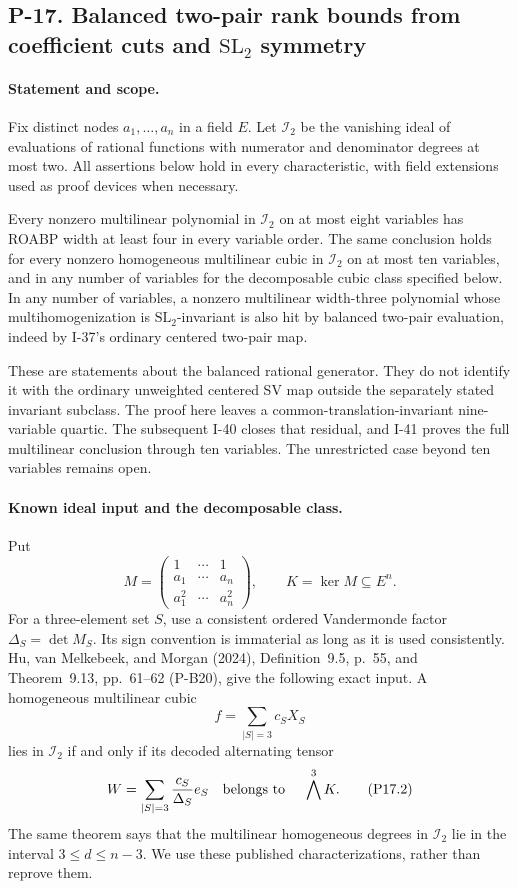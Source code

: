 \subsection{P-17. Balanced two-pair rank bounds from coefficient cuts and $\mathrm{SL}_2$ symmetry}
\label{P-17}

\paragraph{Statement and scope.}
Fix distinct nodes $a_1,\ldots,a_n$ in a field $E$.
Let $\mathcal I_2$ be the vanishing ideal of evaluations of rational
functions with numerator and denominator degrees at most two.
All assertions below hold in every characteristic, with field
extensions used as proof devices when necessary.

Every nonzero multilinear polynomial in $\mathcal I_2$ on at most
eight variables has ROABP width at least four in every variable
order. The same conclusion holds for every nonzero homogeneous
multilinear cubic in $\mathcal I_2$ on at most ten variables,
and in any number of variables for the decomposable cubic class
specified below. In any number of variables, a nonzero multilinear
width-three polynomial whose multihomogenization is
$\mathrm{SL}_2$-invariant is also hit by balanced two-pair
evaluation, indeed by I-37's ordinary centered two-pair map.

These are statements about the balanced rational generator.
They do not identify it with the ordinary unweighted centered SV
map outside the separately stated invariant subclass. The
proof here leaves a common-translation-invariant nine-variable
quartic. The subsequent I-40 closes that residual, and I-41
proves the full multilinear conclusion through ten variables.
The unrestricted case beyond ten variables remains open.

\paragraph{Known ideal input and the decomposable class.}
Put
\[
 M=\begin{pmatrix}1&\cdots&1\\a_1&\cdots&a_n\\a_1^2&\cdots&a_n^2\end{pmatrix},
 \qquad K=\ker M\subseteq E^n.
 \tag{P17.1}
\]
For a three-element set $S$, use a consistent ordered Vandermonde
factor $\Delta_S=\det M_S$. Its sign convention is immaterial as
long as it is used consistently. Hu, van Melkebeek, and Morgan
(2024), Definition~9.5, p.~55, and Theorem~9.13, pp.~61--62
(P-B20), give the following exact input. A homogeneous multilinear
cubic
\[
 f=\sum_{|S|=3}c_S X_S
\]
lies in $\mathcal I_2$ if and only if its decoded alternating tensor
\[
 W=\sum_{|S|=3}\frac{c_S}{\Delta_S}e_S
       \quad\hbox{belongs to }\quad\bigwedge^3 K.
 \tag{P17.2}
\]
The same theorem says that the multilinear homogeneous degrees in
$\mathcal I_2$ lie in the interval $3\le d\le n-3$. We use these
published characterizations, rather than reprove them.


